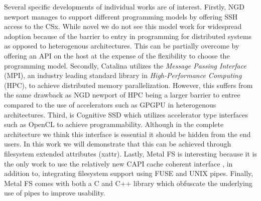 Several specific developments of individual works are of interest. Firstly,
NGD newport \cite{10.1145/3415580} manages to support different programming
models by offering SSH access to the CSx. While novel we do not see this model
work for widespread adoption because of the barrier to entry in programming for
distributed systems as opposed to heterogenous architectures. This can be
partially overcome by offering an API on the host at the expense of the
flexibility to choose the programming model. Secondly, Catalina
\cite{8855540} utilizes the \textit{Message Passing Interface} (MPI), an
industry leading standard library in \textit{High-Performance Computing} (HPC),
to achieve distributed memory parallelization. However, this suffers from the
same drawback as NGD newport of HPC being a larger barrier to entree compared to
the use of accelerators such as GPGPU in heterogenous architectures. Third,
is Cognitive SSD \cite{8839401} which utilizes accelerator type interfaces such
as OpenCL to achieve programmability. Although in the complete architecture we
think this interface is essential it should be hidden from the end users. In
this work we will demonstrate that this can be achieved through filesystem
extended attributes (xattr). Lastly, Metal FS \cite{10.1145/3342195.3387557}
is interesting because it is the only work to use the relatively new CAPI
cache coherent interface \cite{Stuecheli2015CAPIAC}, in addition to, 
integrating filesystem support using FUSE and UNIX pipes. Finally, Metal FS
comes with both a C and C++ library which obfuscate the underlying use of pipes
to improve usability.

